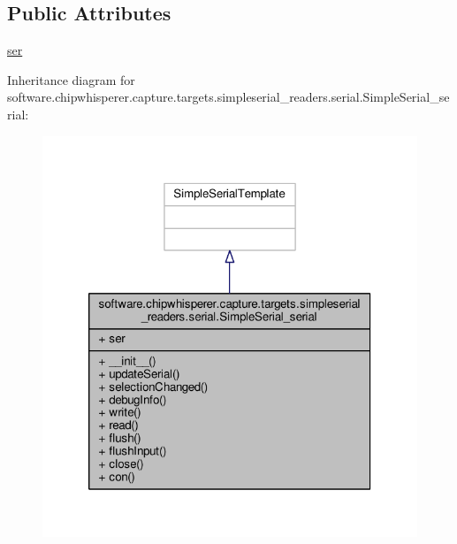 \subsection*{Public Attributes}
\begin{DoxyCompactItemize}
\item 
\hyperlink{classsoftware_1_1chipwhisperer_1_1capture_1_1targets_1_1simpleserial__readers_1_1serial_1_1SimpleSerial__serial_afc12ce094b167d327f0fb8768c86ffe5}{ser}
\end{DoxyCompactItemize}


Inheritance diagram for software.\+chipwhisperer.\+capture.\+targets.\+simpleserial\+\_\+readers.\+serial.\+Simple\+Serial\+\_\+serial\+:\nopagebreak
\begin{figure}[H]
\begin{center}
\leavevmode
\includegraphics[width=320pt]{d4/d9d/classsoftware_1_1chipwhisperer_1_1capture_1_1targets_1_1simpleserial__readers_1_1serial_1_1SimpleSerial__serial__inherit__graph}
\end{center}
\end{figure}


